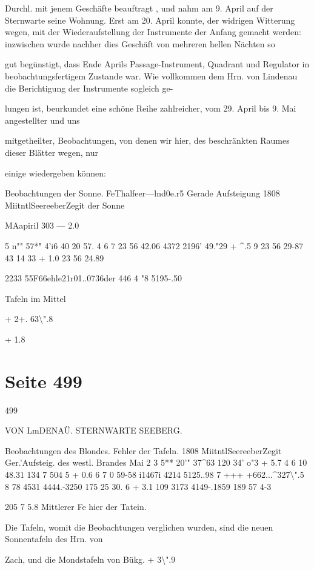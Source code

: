 \documentclass[10pt,a4paper]{article}
\begin{document}
Durchl. mit jenem Geschäfte beauftragt , und nahm am 9. April auf der Sternwarte seine Wohnung. Erst am 20. April konnte, der widrigen Witterung wegen, mit der Wiederaufstellung der Instrumente der Anfang gemacht werden: inzwischen wurde nachher dies Geschäft von mehreren hellen Nächten so

gut begünstigt, dass Ende Aprils Passage-Instrument, Quadrant und Regulator in beobachtungsfertigem Zustande war. Wie vollkommen dem Hrn. von Lindenau die Berichtigung der Instrumente sogleich ge-

lungen ist, beurkundet eine schöne Reihe zahlreicher, vom 29. April bis 9. Mai angestellter und uns

mitgetheilter, Beobachtungen, von denen wir hier, des beschränkten Raumes dieser Blätter wegen, nur

einige wiedergeben können:

Beobachtungen der Sonne. FeThalfeer—lnd0e.r5 Gerade Aufsteigung 1808 MiitntlSeereeberZegit der Sonne

MAapiril 303 — 2.0

5 n"" 57*" 4'i6 40 20 57. 4 6 7 23 56 42.06 4372\textdegree{} 2196' 49."29 + \textasciicircum{}.5 9 23 56 29-87 43 14 33 + 1.0 23 56 24.89

2233 55F66ehle21r01..0736der 446 4 "8 5195-.50

Tafeln im Mittel

+ 2+. 63\textbackslash{}".8

+ 1.8


\newpage
\section*{Seite 499}
499

VON LmDENAÜ. STERNWARTE SEEBERG.

Beobachtungen des Blondes. Fehler der Tafeln. 1808 MiitntlSeereeberZegit Ger.'Aufsteig. des westl. Brandes Mai 2 3 5** 20'" 37\textasciicircum{}63 120\textdegree{} 34' o"3 + 5.7 4 6 10 48.31 134 7 504 5 + 0.6 6 7 0 59-58 i1467i 4214 5125..98 7 +++ +662...\textasciicircum{}327\textbackslash{}".5 8 78 4531 4444.-3250 175 25 30. 6 + 3.1 109 3173 4149-.1859 189 57 4-3

205 7 5.8 Mittlerer Fe hier der Tatein.

Die Tafeln, womit die Beobachtungen verglichen wurden, sind die neuen Sonnentafeln des Hrn. von

Zach, und die Mondstafeln von Bükg. + 3\textbackslash{}".9
\end{document}
